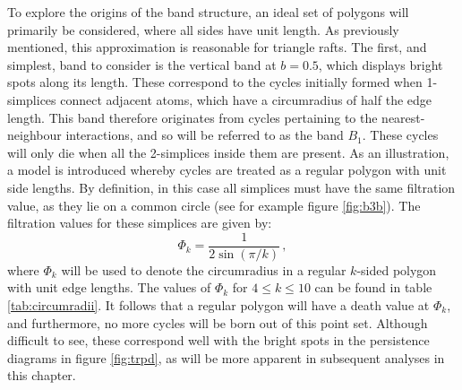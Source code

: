 To explore the origins of the band structure, an ideal set of polygons will primarily be considered, where all sides have unit length.
As previously mentioned, this approximation is reasonable for triangle rafts.
The first, and simplest, band to consider is the vertical band at $b=0.5$, which displays bright spots along its length.
These correspond to the cycles initially formed when 1\--simplices connect adjacent atoms, which have a circumradius of half the edge length.
This band therefore originates from cycles pertaining to the nearest\--neighbour interactions, and so will be referred to as the band $B_1$.
These cycles will only die when all the 2\--simplices inside them are present.
As an illustration, a model is introduced whereby cycles are treated as a regular polygon with unit side lengths.
By definition, in this case all simplices must have the same filtration value, as they lie on a common circle (see for example figure \ref{fig:b3b}).
The filtration values for these simplices are given by:
\begin{equation}
	\Phi_k = \frac{1}{2\sin\left(\pi/k\right)}\,,
\end{equation}
where $\Phi_k$ will be used to denote the circumradius in a regular $k$\--sided polygon with unit edge lengths.
The values of $\Phi_k$ for $4\leq k \leq 10$ can be found in table \ref{tab:circumradii}.
It follows that a regular polygon will have a death value at $\Phi_k$, and furthermore, no more cycles will be born out of this point set.
Although difficult to see, these correspond well with the bright spots in the persistence diagrams in figure \ref{fig:trpd}, as will be more apparent in subsequent analyses in this chapter.

